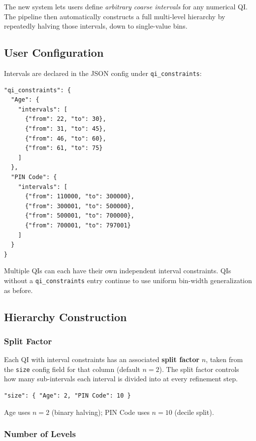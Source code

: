 \documentclass[12pt,a4paper]{article}
\begin{document}
The new system lets users define \emph{arbitrary coarse intervals} for any
numerical QI. The pipeline then automatically constructs a full multi-level
hierarchy by repeatedly halving those intervals, down to single-value bins.

\subsection{User Configuration}

Intervals are declared in the JSON config under \texttt{qi\_constraints}:

\begin{lstlisting}[language={}]
"qi_constraints": {
  "Age": {
    "intervals": [
      {"from": 22, "to": 30},
      {"from": 31, "to": 45},
      {"from": 46, "to": 60},
      {"from": 61, "to": 75}
    ]
  },
  "PIN Code": {
    "intervals": [
      {"from": 110000, "to": 300000},
      {"from": 300001, "to": 500000},
      {"from": 500001, "to": 700000},
      {"from": 700001, "to": 797001}
    ]
  }
}
\end{lstlisting}

Multiple QIs can each have their own independent interval constraints.
QIs without a \texttt{qi\_constraints} entry continue to use uniform bin-width
generalization as before.

\subsection{Hierarchy Construction}

\subsubsection{Split Factor}

Each QI with interval constraints has an associated \textbf{split factor} $n$,
taken from the \texttt{size} config field for that column (default $n{=}2$).
The split factor controls how many sub-intervals each interval is divided into
at every refinement step.

\begin{lstlisting}[language={}]
"size": { "Age": 2, "PIN Code": 10 }
\end{lstlisting}

Age uses $n{=}2$ (binary halving); PIN Code uses $n{=}10$ (decile split).

\subsubsection{Number of Levels}
\end{document}
